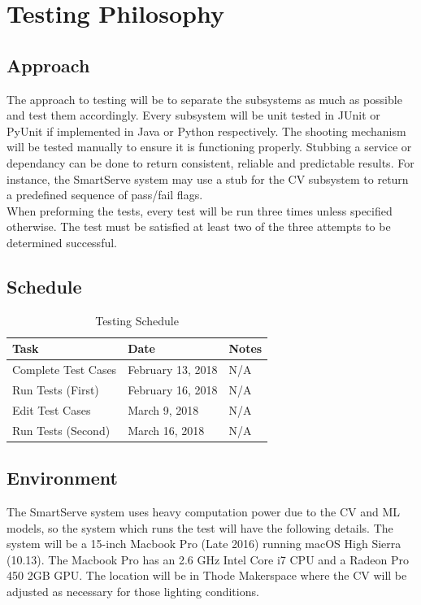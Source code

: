 \documentclass[11pt]{article}
\begin{document}
\section{Testing Philosophy}
\subsection{Approach}
The approach to testing will be to separate the subsystems as much as possible and test them accordingly. Every subsystem will be unit tested in JUnit or PyUnit if implemented in Java or Python respectively. The shooting mechanism will be tested manually to ensure it is functioning properly. Stubbing a service or dependancy can be done to return consistent, reliable and predictable results. For instance, the SmartServe system may use a stub for the CV subsystem to return a predefined sequence of pass/fail flags. \\
When preforming the tests, every test will be run three times unless specified otherwise. The test must be satisfied at least two of the three attempts to be determined successful.
\subsection{Schedule}
\begin{table}[H]
\centering
\label{my-label}
\begin{tabular}{|l|l|l|}
\hline
\textbf{Task} & \textbf{Date} & \textbf{Notes} \\ \hline
Complete Test Cases & February 13, 2018 & N/A \\ \hline
Run Tests (First) & February 16, 2018 & N/A \\ \hline
Edit Test Cases & March 9, 2018 & N/A \\ \hline
Run Tests (Second) & March 16, 2018 & N/A \\ \hline
\end{tabular}
\caption{Testing Schedule}
\end{table}
\subsection{Environment}
The SmartServe system uses heavy computation power due to the CV and ML models, so the system which runs the test will have the following details. The system will be a 15-inch Macbook Pro (Late 2016) running macOS High Sierra (10.13). The Macbook Pro has an 2.6 GHz Intel Core i7 CPU and a Radeon Pro 450 2GB GPU. The location will be in Thode Makerspace where the CV will be adjusted as necessary for those lighting conditions.
\end{document}
